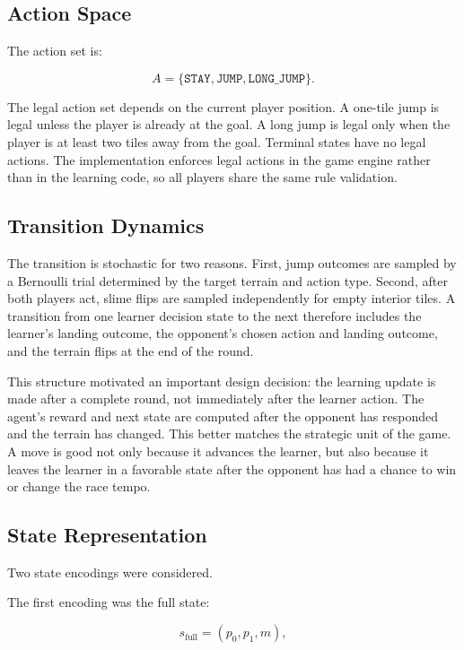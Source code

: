 \documentclass[conference]{IEEEtran}
\begin{document}
\subsection{Action Space}

The action set is:

\begin{equation}
A = \{\texttt{STAY}, \texttt{JUMP}, \texttt{LONG\_JUMP}\}.
\end{equation}

The legal action set depends on the current player position. A one-tile jump is
legal unless the player is already at the goal. A long jump is legal only when the
player is at least two tiles away from the goal. Terminal states have no legal
actions. The implementation enforces legal actions in the game engine rather than
in the learning code, so all players share the same rule validation.

\subsection{Transition Dynamics}

The transition is stochastic for two reasons. First, jump outcomes are sampled by a
Bernoulli trial determined by the target terrain and action type. Second, after
both players act, slime flips are sampled independently for empty interior tiles.
A transition from one learner decision state to the next therefore includes the
learner's landing outcome, the opponent's chosen action and landing outcome, and
the terrain flips at the end of the round.

This structure motivated an important design decision: the learning update is made
after a complete round, not immediately after the learner action. The agent's
reward and next state are computed after the opponent has responded and the terrain
has changed. This better matches the strategic unit of the game. A move is good
not only because it advances the learner, but also because it leaves the learner in
a favorable state after the opponent has had a chance to win or change the race
tempo.

\subsection{State Representation}

Two state encodings were considered.

The first encoding was the full state:

\begin{equation}
s_{\text{full}} = (p_0, p_1, m),
\end{equation}
\end{document}
